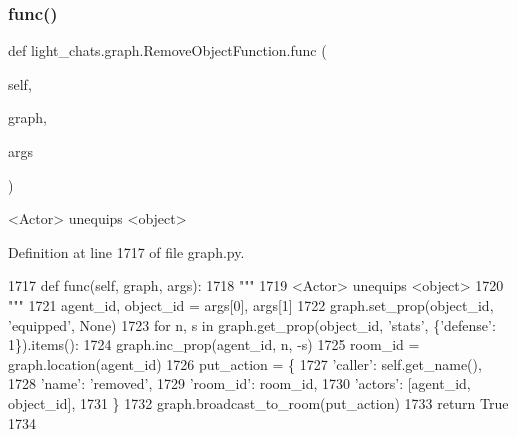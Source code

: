 \subsubsection{\texorpdfstring{func()}{func()}}
{\footnotesize\ttfamily def light\+\_\+chats.\+graph.\+Remove\+Object\+Function.\+func (\begin{DoxyParamCaption}\item[{}]{self,  }\item[{}]{graph,  }\item[{}]{args }\end{DoxyParamCaption})}

\begin{DoxyVerb}<Actor> unequips <object>
\end{DoxyVerb}
 

Definition at line 1717 of file graph.\+py.


\begin{DoxyCode}
1717     \textcolor{keyword}{def }func(self, graph, args):
1718         \textcolor{stringliteral}{"""}
1719 \textcolor{stringliteral}{        <Actor> unequips <object>}
1720 \textcolor{stringliteral}{        """}
1721         agent\_id, object\_id = args[0], args[1]
1722         graph.set\_prop(object\_id, \textcolor{stringliteral}{'equipped'}, \textcolor{keywordtype}{None})
1723         \textcolor{keywordflow}{for} n, s \textcolor{keywordflow}{in} graph.get\_prop(object\_id, \textcolor{stringliteral}{'stats'}, \{\textcolor{stringliteral}{'defense'}: 1\}).items():
1724             graph.inc\_prop(agent\_id, n, -s)
1725         room\_id = graph.location(agent\_id)
1726         put\_action = \{
1727             \textcolor{stringliteral}{'caller'}: self.get\_name(),
1728             \textcolor{stringliteral}{'name'}: \textcolor{stringliteral}{'removed'},
1729             \textcolor{stringliteral}{'room\_id'}: room\_id,
1730             \textcolor{stringliteral}{'actors'}: [agent\_id, object\_id],
1731         \}
1732         graph.broadcast\_to\_room(put\_action)
1733         \textcolor{keywordflow}{return} \textcolor{keyword}{True}
1734 
\end{DoxyCode}
\mbox{\label{classlight__chats_1_1graph_1_1RemoveObjectFunction_a28db384929d4d974a230d27546e23c6b}} 
